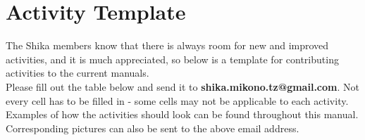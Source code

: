 \chapter{Activity Template} 
\label{cha:activity-template}

The Shika members know that there is always room for new and improved activities, and it is much appreciated, so below is a template for contributing activities to the current manuals.\\

Please fill out the table below and send it to \textbf{shika.mikono.tz@gmail.com}. Not every cell has to be filled in - some cells may not be applicable to each activity. Examples of how the activities should look can be found throughout this manual. Corresponding pictures can also be sent to the above email address.\\

